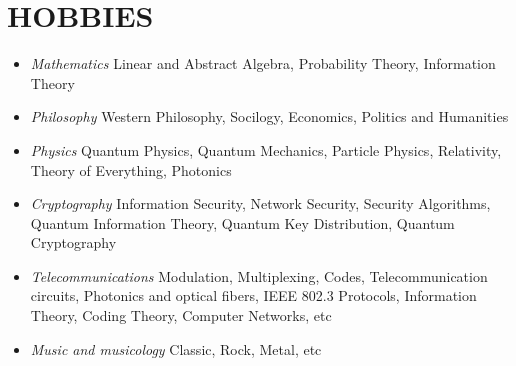 \documentclass[10pt,a4paper]{article}
\begin{document}

\section{HOBBIES}
  \begin{itemize}
    \setlength{\rightskip}{2cm}
    \setlength\itemsep{0em}
    \item \small \textit{Mathematics} Linear and Abstract Algebra, Probability Theory, Information Theory
	  \item \small \textit{Philosophy} Western Philosophy, Socilogy, Economics, Politics and Humanities
	  \item \small \textit{Physics} Quantum Physics, Quantum Mechanics, Particle Physics, Relativity, Theory of Everything, Photonics 
	  \item \small \textit{Cryptography} Information Security, Network Security, Security Algorithms, Quantum Information Theory, Quantum Key Distribution, Quantum Cryptography 
	  \item \small \textit{Telecommunications} Modulation, Multiplexing, Codes, Telecommunication circuits, Photonics and optical fibers, IEEE 802.3 Protocols, Information Theory, Coding Theory, Computer Networks, etc 
    \item \small \textit{Music and musicology} Classic, Rock, Metal, etc
  \end{itemize}
\end{document}

